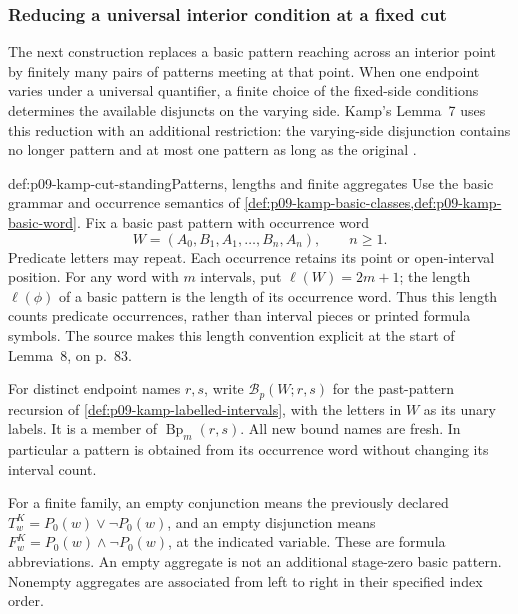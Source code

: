 
\subsubsection{Reducing a universal interior condition at a fixed cut}
\label{sec:p09-kamp-iii2-lemma7}

The next construction replaces a basic pattern reaching across an
interior point by finitely many pairs of patterns meeting at that point.
When one endpoint varies under a universal quantifier, a finite choice
of the fixed-side conditions determines the available disjuncts on the
varying side. Kamp's Lemma~7 uses this reduction with an additional
restriction: the varying-side disjunction contains no longer pattern
and at most one pattern as long as the original
\cite[ch.~III, lemma~7, pp.~80--83]{Kamp1968}.

\begin{hbconvention}{def:p09-kamp-cut-standing}{Patterns, lengths and finite aggregates}
Use the basic grammar and occurrence semantics of
\cref{def:p09-kamp-basic-classes,def:p09-kamp-basic-word}.
Fix a basic past pattern with occurrence word
\[
                W=(A_0,B_1,A_1,\ldots,B_n,A_n),\qquad n\geq1.
\]
Predicate letters may repeat. Each occurrence retains its point or
open-interval position. For any word with \(m\) intervals, put
\(\ell(W)=2m+1\); the length \(\ell(\phi)\) of a basic pattern
is the length of its occurrence word. Thus this length counts predicate
occurrences, rather than interval pieces or printed formula symbols.
The source makes this length convention explicit at the start of
Lemma~8, on p.~83.

For distinct endpoint names \(r,s\), write
\(\mathcal B_p(W;r,s)\) for the past-pattern recursion of
\cref{def:p09-kamp-labelled-intervals}, with the letters in \(W\)
as its unary labels. It is a member of \(\operatorname{Bp}_m(r,s)\).
All new bound names are fresh. In particular a pattern is obtained from
its occurrence word without changing its interval count.

For a finite family, an empty conjunction means the previously declared
\(T^K_w=P_0(w)\lor\neg P_0(w)\), and an empty disjunction means
\(F^K_w=P_0(w)\land\neg P_0(w)\), at the indicated variable.
These are formula abbreviations. An empty aggregate is not an additional
stage-zero basic pattern. Nonempty aggregates are associated from left
to right in their specified index order.
\end{hbconvention}

